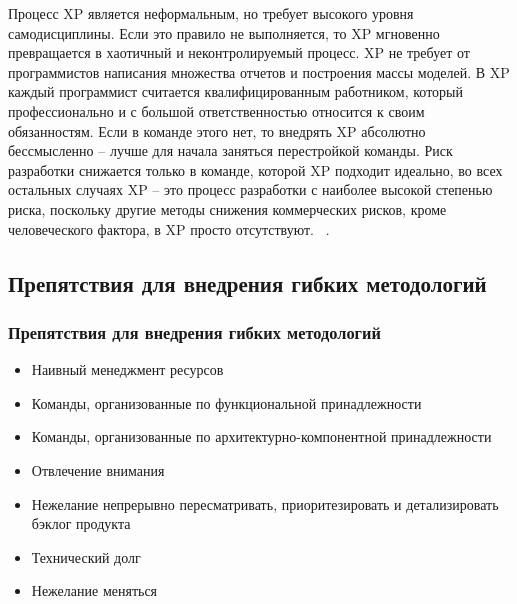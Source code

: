 \documentclass{../industrial-development}
\begin{document}
\lecturenotes
Процесс XP является неформальным, но требует высокого уровня самодисциплины. Если это правило не выполняется, то XP мгновенно превращается в хаотичный и неконтролируемый процесс. XP не требует от программистов написания множества отчетов и построения массы моделей. В XP каждый программист считается квалифицированным работником, который профессионально и с большой ответственностью относится к своим обязанностям. Если в команде этого нет, то внедрять XP абсолютно бессмысленно – лучше для начала заняться перестройкой команды. Риск разработки снижается только в команде, которой XP подходит идеально, 
во всех остальных случаях XP – это процесс разработки с наиболее высокой степенью риска, поскольку другие методы снижения коммерческих рисков, кроме человеческого фактора, в XP просто отсутствуют. 
~\cite{Fowler}.


\subsection{Препятствия для внедрения гибких методологий}
\begin{frame} \frametitle{Препятствия для внедрения гибких методологий}
  \begin{itemize}
		\item Наивный менеджмент ресурсов 
		\item Команды, организованные по функциональной принадлежности  
		\item Команды, организованные по архитектурно-компонентной принадлежности 
		\item Отвлечение внимания 
		\item Нежелание непрерывно пересматривать, приоритезировать и детализировать бэклог продукта 
		\item Технический долг
		\item Нежелание меняться 
	\end{itemize}
\end{frame}
\end{document}
